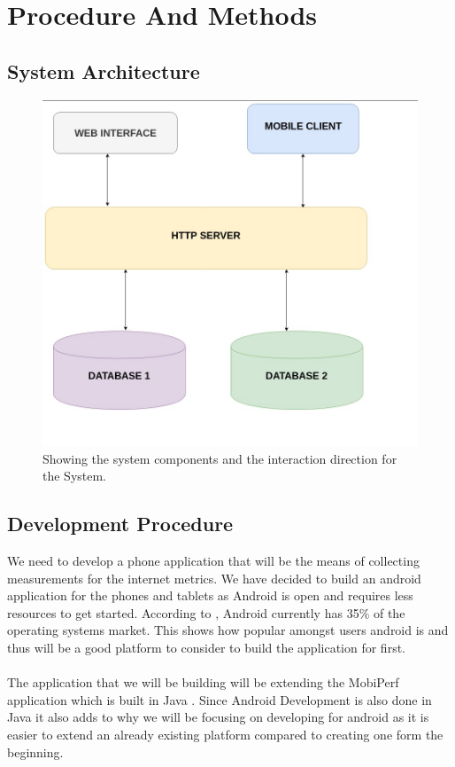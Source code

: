 \section{Procedure And Methods}
\subsection{System Architecture}
\begin{figure}
	\begin{center}
		\includegraphics[width=1\linewidth]{res/system.jpeg}
	\end{center}
	\caption{Showing the system components and the interaction direction for the System.}
	\label{fig-ffsm}
\end{figure}
\subsection{Development Procedure}
We need to develop a phone application that will be the means of collecting measurements for the internet metrics. We have decided to build an android application for the phones and tablets as Android is open and requires less resources to get started. According to \cite{statcounter_global_stats}, Android currently has 35\% of the operating systems market. This shows how popular amongst users android is and thus will be a good platform to consider to build the application for first. 
\paragraph{}
The application that we will be building will be extending the MobiPerf application which is built in Java \cite{m-lab}. Since Android Development is also done in Java it also adds to why we will be focusing on developing for android as it is easier to extend an already existing platform compared to creating one form the beginning.

